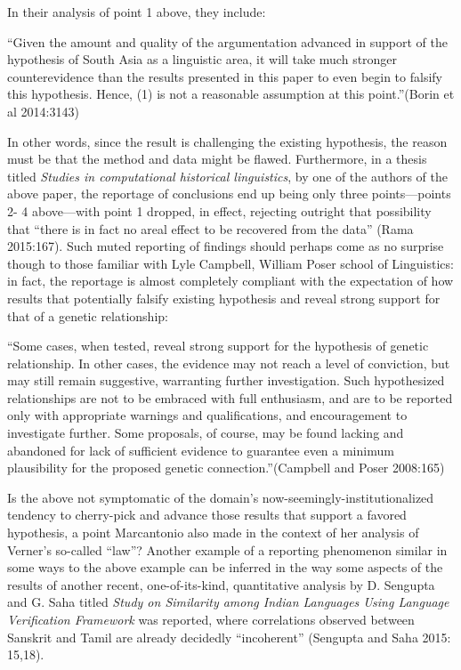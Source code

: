 In their analysis of point 1 above, they include:

\begin{myquote}
“Given the amount and quality of the argumentation advanced in support of the hypothesis of South Asia as a linguistic area, it will take much stronger counterevidence than the results presented in this paper to even begin to falsify this hypothesis. Hence, (1) is not a reasonable assumption at this point.”\hfill (Borin et al 2014:3143)
\end{myquote}

In other words, since the result is challenging the existing hypothesis, the reason must be that the method and data might be flawed. Furthermore, in a thesis titled \textit{Studies in computational historical linguistics}, by one of the authors of the above paper, the reportage of conclusions end up being only three points—points 2- 4 above—with point 1 dropped, in effect, rejecting outright that possibility that “there is in fact no areal effect to be recovered from the data” (Rama 2015:167). Such muted reporting of findings should perhaps come as no surprise though to those familiar with Lyle Campbell, William Poser school of Linguistics: in fact, the reportage is almost completely compliant with the expectation of how results that potentially falsify existing hypothesis and reveal strong support for that of a genetic relationship:

\begin{myquote}
“Some cases, when tested, reveal strong support for the hypothesis of genetic relationship. In other cases, the evidence may not reach a level of conviction, but may still remain suggestive, warranting further investigation. Such hypothesized relationships are not to be embraced with full enthusiasm, and are to be reported only with appropriate warnings and qualifications, and encouragement to investigate further. Some proposals, of course, may be found lacking and abandoned for lack of sufficient evidence to guarantee even a minimum plausibility for the proposed genetic connection.”\hfill (Campbell and Poser 2008:165)
\end{myquote}

Is the above not symptomatic of the domain’s now-seemingly-institutionalized tendency to cherry-pick and advance those results that support a favored hypothesis, a point Marcantonio also made in the context of her analysis of Verner’s so-called “law”? Another example of a reporting phenomenon similar in some ways to the above example can be inferred in the way some aspects of the results of another recent, one-of-its-kind, quantitative analysis by D. Sengupta and G. Saha titled \textit{Study on Similarity among Indian Languages Using Language Verification Framework} was reported, where correlations observed between Sanskrit and Tamil are already decidedly “incoherent” (Sengupta and Saha 2015: 15,18).


